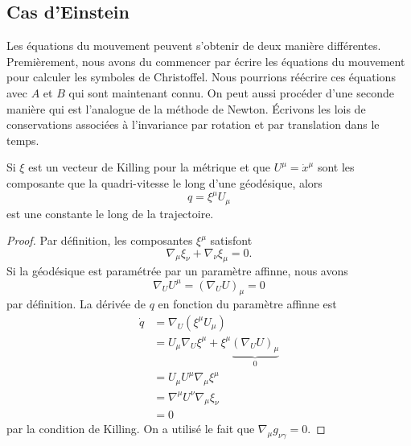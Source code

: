 \documentclass[a4paper,11pt]{report}
\begin{document}
        
        
        \subsection{Cas d'Einstein}
        
            Les équations du mouvement peuvent s'obtenir de deux manière différentes. Premièrement, nous avons du commencer par écrire les équations du mouvement pour calculer les symboles de Christoffel. Nous pourrions réécrire ces équations avec $A$ et $B$ qui sont maintenant connu. On peut aussi procéder d'une seconde manière qui est l'analogue de la méthode de Newton. Écrivons les lois de conservations associées à l'invariance par rotation et par translation dans le temps.
            
            \begin{prop}\begin{leftbar}
                Si $\xi$ est un vecteur de Killing pour la métrique et que $U^\mu = \dot{x}^\mu$ sont les composante que la quadri-vitesse le long d'une géodésique, alors
                \begin{equation}
                    q = \xi^\mu U_\mu
                \end{equation}
                est une constante le long de la trajectoire.
            \end{leftbar}\end{prop}
            
            \begin{proof}
                Par définition, les composantes $\xi^\mu$ satisfont
                \begin{equation}
                    \nabla_\mu\xi_\nu + \nabla_\nu\xi_\mu = 0.
                \end{equation}
                Si la géodésique est paramétrée par un paramètre affinne, nous avons 
                \begin{equation}
                    \nabla_U U^\mu = (\nabla_U U)_\mu = 0
                \end{equation}
                par définition. La dérivée de $q$ en fonction du paramètre affinne  est
                \begin{align}
                    \dot{q} &= \nabla_U(\xi^\mu U_\mu)\\
                    &= U_\mu\nabla_U \xi^\mu + \xi^\mu\underbrace{(\nabla_U U)_\mu}_{0}\\
                    &= U_\mu U^\mu\nabla_\mu \xi^\mu\\
                    &= \nabla^\mu U^\nu \nabla_\mu \xi_\nu\\
                    &= 0
                \end{align}
                par la condition de Killing. On a utilisé le fait que $\nabla_\mu g_{\nu\gamma} = 0$.
            \end{proof}
            
\end{document}
